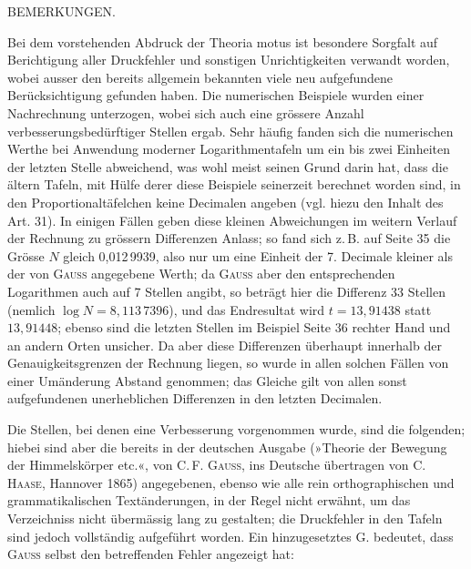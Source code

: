 \clearpage
{}
\begin{center}\large BEMERKUNGEN.\end{center}
Bei dem vorstehenden Abdruck der Theoria motus ist besondere Sorgfalt auf Berichtigung
aller Druckfehler und sonstigen Unrichtigkeiten verwandt worden, wobei ausser den bereits
allgemein bekannten viele neu aufgefundene Berücksichtigung gefunden haben. Die
numerischen Beispiele wurden einer Nachrechnung unterzogen, wobei sich auch eine grössere
Anzahl verbesserungsbedürftiger Stellen ergab. Sehr häufig fanden sich die numerischen
Werthe bei Anwendung moderner Logarithmentafeln um ein bis zwei Einheiten der letzten
Stelle abweichend, was wohl meist seinen Grund darin hat, dass die ältern Tafeln, mit
Hülfe derer diese Beispiele seinerzeit berechnet worden sind, in den Proportionaltäfelchen
keine Decimalen angeben (vgl. hiezu den Inhalt des Art. 31). In einigen Fällen geben diese
kleinen Abweichungen im weitern Verlauf der Rechnung zu grössern Differenzen Anlass; so
fand sich z.\,B. auf Seite 35 die Grösse $N$ gleich 0,012\,9939, also nur um eine Einheit
der 7. Decimale kleiner als der von \textsc{Gauss} angegebene Werth; da \textsc{Gauss} aber den
entsprechenden Logarithmen auch auf 7 Stellen angibt, so beträgt hier die Differenz 33
Stellen (nemlich $\log N = 8{,}113\,7396$), und das Endresultat wird $t = 13{,}91438$
statt $13{,}91448$; ebenso sind die letzten Stellen im Beispiel Seite 36 rechter Hand und
an andern Orten unsicher. Da aber diese Differenzen überhaupt innerhalb der
Genauigkeitsgrenzen der Rechnung liegen, so wurde in allen solchen Fällen von einer
Umänderung Abstand genommen; das Gleiche gilt von allen sonst aufgefundenen unerheblichen
Differenzen in den letzten Decimalen.

Die Stellen, bei denen eine Verbesserung vorgenommen wurde, sind die folgenden; hiebei
sind aber die bereits in der deutschen Ausgabe (»Theorie der Bewegung der Himmelskörper
etc.«, von C.\,F. \textsc{Gauss}, ins Deutsche übertragen von C. \textsc{Haase}, Hannover 1865) angegebenen,
ebenso wie alle rein orthographischen und grammatikalischen Textänderungen, in der Regel
nicht erwähnt, um das Verzeichniss nicht übermässig lang zu gestalten; die Druckfehler in
den Tafeln sind jedoch vollständig aufgeführt worden. Ein hinzugesetztes G. bedeutet, dass
\textsc{Gauss} selbst den betreffenden Fehler angezeigt hat:

